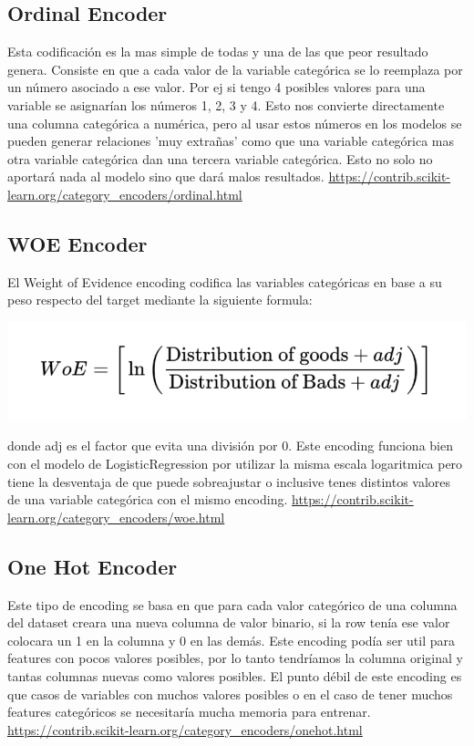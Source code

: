 \documentclass[12pt,a4paper]{article}
\begin{document}
\subsection{Ordinal Encoder}
Esta codificación es la mas simple de todas y una de las que peor resultado genera. Consiste en que a cada valor de la variable categórica se lo reemplaza por un número asociado a ese valor. Por ej si tengo 4 posibles valores para una variable se asignarían los números 1, 2, 3 y 4.
Esto nos convierte directamente una columna categórica a numérica, pero al usar estos números en los modelos se pueden generar relaciones 'muy extrañas' como que una variable categórica mas otra variable categórica dan una tercera variable categórica. Esto no solo no aportará nada al modelo sino que dará malos resultados.
\url{https://contrib.scikit-learn.org/category_encoders/ordinal.html}

\subsection{WOE Encoder}
El Weight of Evidence encoding codifica las variables categóricas en base a su peso respecto del target mediante la siguiente formula:
\begin{center}
    \includegraphics[scale=0.5]{imgs/WOE.png}
\end{center}
donde adj es el factor que evita una división por 0.
Este encoding funciona bien con el modelo de LogisticRegression por utilizar la misma escala logaritmica pero tiene la desventaja de que puede sobreajustar o inclusive tenes distintos valores de una variable categórica con el mismo encoding. 
\url{https://contrib.scikit-learn.org/category_encoders/woe.html}

\subsection{One Hot Encoder}
Este tipo de encoding se basa en que para cada valor categórico de una columna del dataset creara una nueva columna de valor binario, si la row tenía ese valor colocara un 1 en la columna y 0 en las demás. Este encoding podía ser util para features con pocos valores posibles, por lo tanto tendríamos la columna original y tantas columnas nuevas como valores posibles. El punto débil de este encoding es que casos de variables con muchos valores posibles o en el caso de tener muchos features categóricos se necesitaría mucha memoria para entrenar.
\url{https://contrib.scikit-learn.org/category_encoders/onehot.html}
\end{document}
